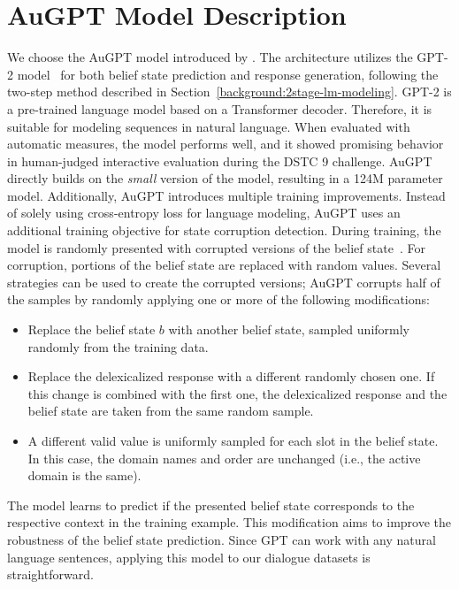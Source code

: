 \section{AuGPT Model Description}
\label{06:augpt}
We choose the AuGPT model introduced by \citet{kulhanek-etal-2021-augpt}.
The architecture utilizes the GPT-2 model~\cite{radford2019language} for both belief state prediction and response generation, following the two-step method described in Section~\ref{background:2stage-lm-modeling}.
GPT-2 is a pre-trained language model based on a Transformer decoder.
Therefore, it is suitable for modeling sequences in natural language.
When evaluated with automatic measures, the model performs well, and it showed promising behavior in human-judged interactive evaluation during the DSTC 9 \citep{gunasekara2020overview} challenge. 
AuGPT directly builds on the \emph{small} version of the model, resulting in a 124M parameter model.
Additionally, AuGPT introduces multiple training improvements.
Instead of solely using cross-entropy loss for language modeling, AuGPT uses an additional training objective for state corruption detection.
During training, the model is randomly presented with corrupted versions of the belief state~\citep{peng2021soloist}.
For corruption, portions of the belief state are replaced with random values.
Several strategies can be used to create the corrupted versions; AuGPT corrupts half of the samples by randomly applying one or more of the following modifications:
\begin{itemize}
    \item Replace the belief state $b$ with another belief state, sampled uniformly randomly from the training data.
    \item Replace the delexicalized response with a different randomly chosen one. If this change is combined with the first one, the delexicalized response and the belief state are taken from the same random sample.
    \item A different valid value is uniformly sampled for each slot in the belief state. In this case, the domain names and order are unchanged (i.e., the active domain is the same).
\end{itemize}
The model learns to predict if the presented belief state corresponds to the respective context in the training example.
This modification aims to improve the robustness of the belief state prediction.
Since GPT can work with any natural language sentences, applying this model to our dialogue datasets is straightforward.

